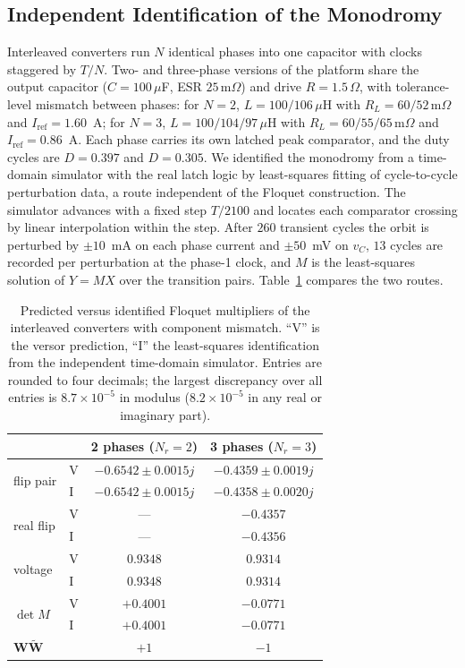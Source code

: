 \documentclass[journal]{IEEEtran}
\newcommand{\rev}[1]{\widetilde{#1}}
\begin{document}
\subsection{Independent Identification of the Monodromy}
\label{sec:ident}
Interleaved converters run $N$ identical phases into one capacitor with
clocks staggered by $T/N$. Two- and three-phase versions of the platform
share the output capacitor ($C=100\,\mu$F, ESR $25\,\mathrm{m}\Omega$) and
drive $R=1.5\,\Omega$, with tolerance-level mismatch between phases: for
$N=2$, $L=100/106\,\mu$H with $R_L=60/52\,\mathrm{m}\Omega$ and
$I_{\mathrm{ref}}=1.60$~A; for $N=3$, $L=100/104/97\,\mu$H with
$R_L=60/55/65\,\mathrm{m}\Omega$ and $I_{\mathrm{ref}}=0.86$~A. Each phase
carries its own latched peak comparator, and the duty cycles are $D=0.397$
and $D=0.305$. We identified the monodromy from a time-domain simulator with
the real latch logic by least-squares fitting of cycle-to-cycle perturbation
data, a route independent of the Floquet construction. The simulator advances
with a fixed step $T/2100$ and locates each comparator crossing by linear
interpolation within the step. After $260$ transient cycles the orbit is
perturbed by $\pm10$~mA on each phase current and $\pm50$~mV on $v_C$, $13$
cycles are recorded per perturbation at the phase-1 clock, and $M$ is the
least-squares solution of $Y=MX$ over the transition pairs.
Table~\ref{tab:ident} compares the two routes.

\begin{table}[!t]
\caption{Predicted versus identified Floquet multipliers of the interleaved
converters with component mismatch. ``V'' is the versor prediction, ``I''
the least-squares identification from the independent time-domain
simulator. Entries are rounded to four decimals; the largest discrepancy
over all entries is $8.7\times10^{-5}$ in modulus ($8.2\times10^{-5}$ in any
real or imaginary part).}
\label{tab:ident}
\centering
\setlength{\tabcolsep}{4pt}
\begin{tabular}{@{}llcc@{}}
\toprule
& & 2 phases ($N_r=2$) & 3 phases ($N_r=3$) \\
\midrule
\multirow{2}{*}{flip pair}
  & V & $-0.6542\pm0.0015j$ & $-0.4359\pm0.0019j$ \\
  & I & $-0.6542\pm0.0015j$ & $-0.4358\pm0.0020j$ \\[2pt]
\multirow{2}{*}{real flip}
  & V & --- & $-0.4357$ \\
  & I & --- & $-0.4356$ \\[2pt]
\multirow{2}{*}{voltage}
  & V & $0.9348$ & $0.9314$ \\
  & I & $0.9348$ & $0.9314$ \\[2pt]
\multirow{2}{*}{$\det M$}
  & V & $+0.4001$ & $-0.0771$ \\
  & I & $+0.4001$ & $-0.0771$ \\[2pt]
$\bm{W}\rev{\bm{W}}$ & & $+1$ & $-1$ \\
\bottomrule
\end{tabular}
\end{table}
\end{document}
